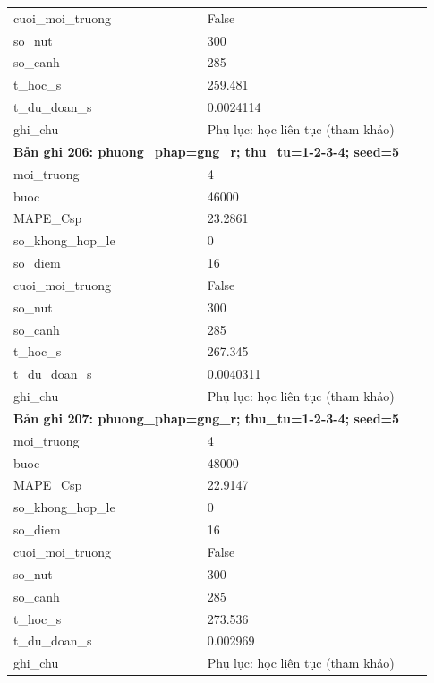 \begin{longtable}{p{0.43\linewidth}p{0.50\linewidth}}
cuoi\_\allowbreak moi\_\allowbreak truong & False \\
so\_\allowbreak nut & 300 \\
so\_\allowbreak canh & 285 \\
t\_\allowbreak hoc\_\allowbreak s & 259.481 \\
t\_\allowbreak du\_\allowbreak doan\_\allowbreak s & 0.0024114 \\
ghi\_\allowbreak chu & Phụ lục: học liên tục (tham khảo) \\
\midrule
\multicolumn{2}{p{0.95\linewidth}}{\textbf{Bản ghi 206: phuong\_phap=gng\_r; thu\_tu=1-2-3-4; seed=5}} \\
moi\_\allowbreak truong & 4 \\
buoc & 46000 \\
MAPE\_\allowbreak Csp & 23.2861 \\
so\_\allowbreak khong\_\allowbreak hop\_\allowbreak le & 0 \\
so\_\allowbreak diem & 16 \\
cuoi\_\allowbreak moi\_\allowbreak truong & False \\
so\_\allowbreak nut & 300 \\
so\_\allowbreak canh & 285 \\
t\_\allowbreak hoc\_\allowbreak s & 267.345 \\
t\_\allowbreak du\_\allowbreak doan\_\allowbreak s & 0.0040311 \\
ghi\_\allowbreak chu & Phụ lục: học liên tục (tham khảo) \\
\midrule
\multicolumn{2}{p{0.95\linewidth}}{\textbf{Bản ghi 207: phuong\_phap=gng\_r; thu\_tu=1-2-3-4; seed=5}} \\
moi\_\allowbreak truong & 4 \\
buoc & 48000 \\
MAPE\_\allowbreak Csp & 22.9147 \\
so\_\allowbreak khong\_\allowbreak hop\_\allowbreak le & 0 \\
so\_\allowbreak diem & 16 \\
cuoi\_\allowbreak moi\_\allowbreak truong & False \\
so\_\allowbreak nut & 300 \\
so\_\allowbreak canh & 285 \\
t\_\allowbreak hoc\_\allowbreak s & 273.536 \\
t\_\allowbreak du\_\allowbreak doan\_\allowbreak s & 0.002969 \\
ghi\_\allowbreak chu & Phụ lục: học liên tục (tham khảo) \\

\end{longtable}
